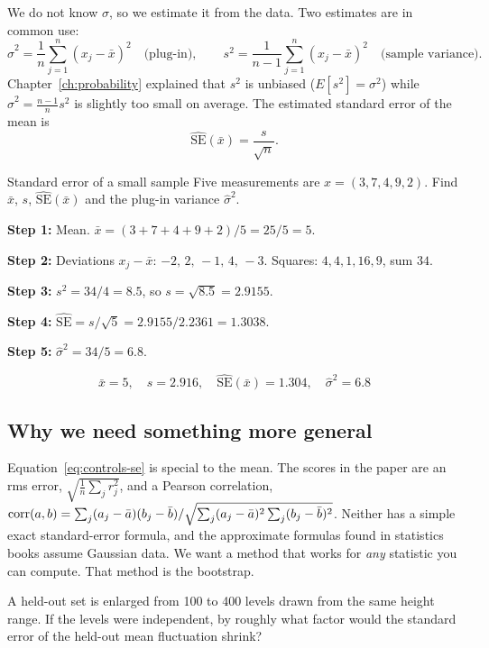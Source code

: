 We do not know $\sigma$, so we estimate it from the data. Two estimates are in common use:
\begin{equation}
\hat\sigma^2=\frac1n\sum_{j=1}^n(x_j-\bar x)^2\quad\text{(plug-in)},\qquad
s^2=\frac1{n-1}\sum_{j=1}^n(x_j-\bar x)^2\quad\text{(sample variance)}.
\label{eq:controls-twovar}
\end{equation}
Chapter~\ref{ch:probability} explained that $s^2$ is unbiased ($E[s^2]=\sigma^2$) while $\hat\sigma^2=\frac{n-1}{n}s^2$ is slightly too small on average. The estimated standard error of the mean is
\begin{equation}
\widehat{\mathrm{SE}}(\bar x)=\frac{s}{\sqrt n}.
\label{eq:controls-se}
\end{equation}

\begin{sample}{Standard error of a small sample}
Five measurements are $x=(3,7,4,9,2)$. Find $\bar x$, $s$, $\widehat{\mathrm{SE}}(\bar x)$ and the plug-in variance $\hat\sigma^2$.

\textbf{Step 1:} Mean. $\bar x=(3+7+4+9+2)/5=25/5=5$.

\textbf{Step 2:} Deviations $x_j-\bar x$: $-2,\,2,\,-1,\,4,\,-3$. Squares: $4,4,1,16,9$, sum $34$.

\textbf{Step 3:} $s^2=34/4=8.5$, so $s=\sqrt{8.5}=2.9155$.

\textbf{Step 4:} $\widehat{\mathrm{SE}}=s/\sqrt5=2.9155/2.2361=1.3038$.

\textbf{Step 5:} $\hat\sigma^2=34/5=6.8$.

\[
\boxed{\bar x=5,\quad s=2.916,\quad \widehat{\mathrm{SE}}(\bar x)=1.304,\quad \hat\sigma^2=6.8}
\]
\end{sample}

\subsection{Why we need something more general}

Equation~\eqref{eq:controls-se} is special to the mean. The scores in the paper are an rms error, $\sqrt{\frac1n\sum_j r_j^2}$, and a Pearson correlation, $\mathrm{corr}(a,b)=\sum_j(a_j-\bar a)(b_j-\bar b)/\sqrt{\sum_j(a_j-\bar a)^2\sum_j(b_j-\bar b)^2}$. Neither has a simple exact standard-error formula, and the approximate formulas found in statistics books assume Gaussian data. We want a method that works for \emph{any} statistic you can compute. That method is the bootstrap.

\begin{checkpoint}
A held-out set is enlarged from 100 to 400 levels drawn from the same height range. If the levels were independent, by roughly what factor would the standard error of the held-out mean fluctuation shrink?
\end{checkpoint}

